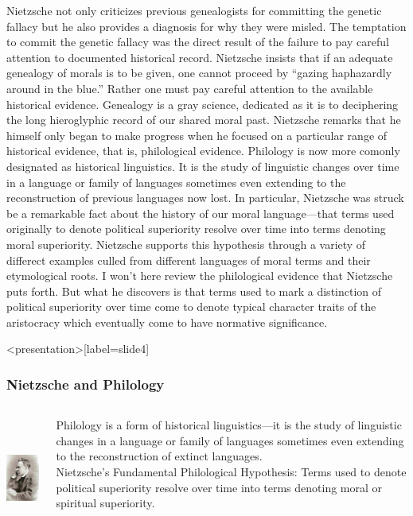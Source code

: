 Nietzsche not only criticizes previous genealogists for committing the genetic fallacy but he also provides a diagnosis for why they were misled. The temptation to commit the genetic fallacy was the direct result of the failure to pay careful attention to documented historical record. Nietzsche insists that if an adequate genealogy of morals is to be given, one cannot proceed by  ``gazing haphazardly around in the blue.'' Rather  one must pay careful attention to the available historical evidence. Genealogy is a gray science, dedicated as it is to deciphering the long hieroglyphic record of our shared moral past. Nietzsche remarks that he himself only began to make progress when he focused on a particular range of historical evidence, that is, philological evidence. Philology is now more comonly designated as historical linguistics. It is the study of linguistic changes over time in a language or family of languages sometimes even extending to the reconstruction of previous languages now lost. In particular, Nietzsche was struck be a remarkable fact about the history of our moral language---that terms used originally to denote political superiority resolve over time into terms denoting moral superiority. Nietzsche supports this hypothesis through a variety of differect examples culled from different languages of moral terms and their etymological roots. I won't here review the philological evidence that Nietzsche puts forth. But what he discovers is that terms used to mark a distinction of political superiority over time come to denote typical character traits  of the aristocracy which eventually come to have normative significance. \change

\begin{frame}<presentation>[label=slide4]
    \frametitle{Nietzsche and Philology}
        \begin{columns}
            \begin{column}{3cm}
                \includegraphics[height=4cm]{../../graphics/nietzsche.jpg}
            \end{column}
            \begin{column}{7cm}
                \alert{Philology} is a form of historical linguistics---it is the study of linguistic changes in a language or family of languages sometimes even extending to the reconstruction of extinct languages.\\
                \alert{Nietzsche's Fundamental Philological Hypothesis}: Terms used to denote political superiority resolve over time into terms denoting moral or spiritual superiority.
            \end{column}
        \end{columns}
\end{frame}

